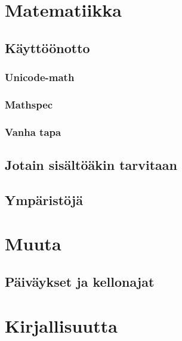\documentclass{book}
\begin{document}
\tableofcontents

\cleardoublepage







\chapter{Matematiikka}
\label{luku:matematiikka}
\section{Käyttöönotto}
\subsection{Unicode-math}
\subsection{Mathspec}
\subsection{Vanha tapa}
\section{Jotain sisältöäkin tarvitaan}
\section{Ympäristöjä}

\chapter{Muuta}
\section{Päiväykset ja kellonajat}

\backmatter
\chapter{Kirjallisuutta}
\end{document}
